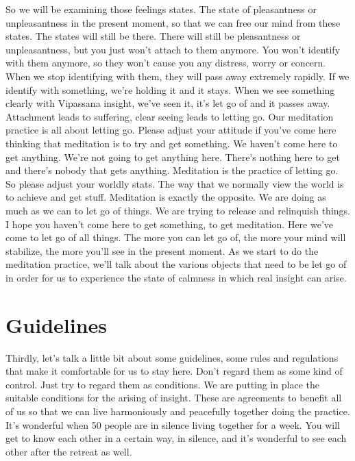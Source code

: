 \documentclass[letterpaper,10pt,english]{sphinxmanual}
\begin{document}
\sphinxAtStartPar
So we will be examining those feelings states. The state of pleasantness or unpleasantness in the present moment, so that we can free our mind
from  these  states.  The  states  will  still  be  there.  There  will  still  be  pleasantness or unpleasantness, but you just won’t attach to them anymore. You
won’t  identify  with  them  anymore,  so  they  won’t  cause  you  any  distress,
worry or concern. When we stop identifying with them, they will pass away
extremely  rapidly.  If  we  identify  with  something,  we’re  holding  it  and  it
stays. When we see something clearly with Vipassana insight, we’ve seen it,
it’s let go of and it passes away. Attachment leads to suffering, clear seeing
leads  to  letting  go.  Our  meditation  practice  is  all  about  letting  go.  Please
adjust your attitude if you’ve come here thinking that meditation is to try and
get something. We haven’t come here to get anything. We’re not going to get
anything here. There’s nothing here to get and there’s nobody that gets anything. Meditation is the practice of letting go. So please adjust your worldly
stats. The way that we normally view the world is to achieve and get stuff.
Meditation is exactly the opposite. We are doing as much as we can to let go
of things. We are trying to release and relinquish things. I hope you haven’t
come here to get something, to get meditation. Here we’ve come to let go
of all things. The more you can let go of, the more your mind will stabilize,
the more you’ll see in the present moment. As we start to do the meditation
practice, we’ll talk about the various objects that need to be let go of in order
for us to experience the state of calmness in which real insight can arise.


\section{Guidelines}
\label{\detokenize{0-a:guidelines}}
\sphinxAtStartPar
Thirdly,  let’s  talk  a  little  bit  about  some  guidelines,  some  rules  and
regulations that make it comfortable for us to stay here. Don’t regard them as
some kind of control. Just try to regard them as conditions. We are putting
in place the suitable conditions for the arising of insight. These are agreements    to benefit all of us so that we can live harmoniously and peacefully
together  doing  the  practice.  It’s  wonderful  when  50  people  are  in  silence
living together for a week. You will get to know each other in a certain way,
in silence, and it’s wonderful to see each other after the retreat as well.
\end{document}
